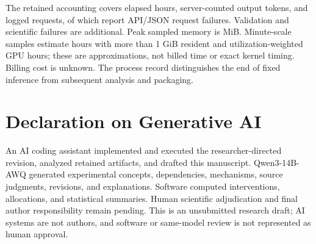 \documentclass{svproc}
\begin{document}
The retained accounting covers \RunElapsedHours{} elapsed hours, \RunOutputTokens{} server-counted output tokens, and \RunRequests{} logged requests, of which \RunRequestErrors{} report API/JSON request failures. Validation and scientific failures are additional. Peak sampled memory is \RunPeakMemory{} MiB. Minute-scale samples estimate \RunResidentHours{} hours with more than 1 GiB resident and \RunGPUHours{} utilization-weighted GPU hours; these are approximations, not billed time or exact kernel timing. Billing cost is unknown. The process record distinguishes the end of fixed inference from subsequent analysis and packaging.

\section*{Declaration on Generative AI}
An AI coding assistant implemented and executed the researcher-directed revision, analyzed retained artifacts, and drafted this manuscript. Qwen3-14B-AWQ generated experimental concepts, dependencies, mechanisms, source judgments, revisions, and explanations. Software computed interventions, allocations, and statistical summaries. Human scientific adjudication and final author responsibility remain pending. This is an unsubmitted research draft; AI systems are not authors, and software or same-model review is not represented as human approval.
\end{document}
